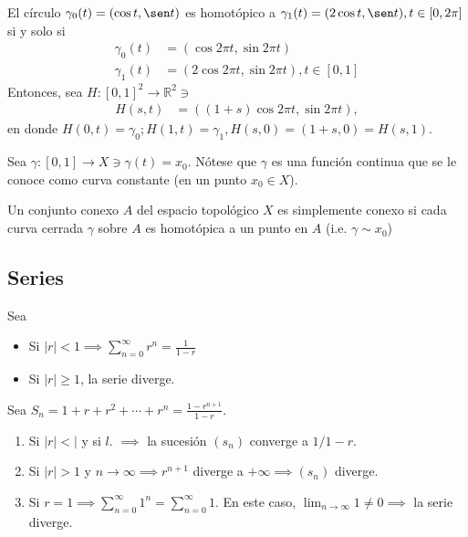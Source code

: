 \begin{ejemplo}
    El círculo $\gamma_0(t)=(\cos t,\sen t)$ es homotópico a $\gamma_1(t)=(2\cos t,\sen t),t\in [0,2\pi]$ si y solo si 
    \begin{align*}
        \gamma_0(t) &= (\cos 2\pi t,\sin 2\pi t)\\
        \gamma_1(t) &= (2\cos 2\pi t,\sin 2\pi t), t\in [0,1]
    \end{align*}
    Entonces, sea $H:[0,1]^2\to \mathbb{R}^2\ni$ 
    \begin{align*}
        H(s,t)&=\left((1+s)\cos2\pi t, \sin 2\pi t\right),
    \end{align*}
    en donde $H(0,t)=\gamma_0;H(1,t)=\gamma_1,H(s,0)=(1+s,0)=H(s,1)$.
\end{ejemplo}

\begin{nota}
    Sea $\gamma:[0,1]\to X\ni \gamma(t)=x_0$. Nótese que $\gamma$ es una función continua que se le conoce como curva constante (en un punto $x_0\in X$).
\end{nota}

\begin{definicion}
    Un conjunto conexo $A$ del espacio topológico $X$ es simplemente conexo si cada curva cerrada $\gamma$ sobre $A$ es homotópica a un punto en $A$ (i.e. $\gamma\sim x_0$)
\end{definicion}

\subsection{Series}

\begin{prop}
    Sea \begin{itemize}
        \item Si $|r|<1\implies \sum_{n=0}^{\infty}r^n =\frac{1}{1-r}$
        \item Si $|r|\geq 1$, la serie diverge. 
    \end{itemize}
    \begin{dem}
        Sea $S_n=1+r+r^2+\cdots+r^n=\frac{1-r^{n+1}}{1-r}$.
        \begin{enumerate}
            \item Si $|r|<|$ y si $l$. $\implies$ la sucesión $(s_n)$ converge a $1/1-r$. 
            \item Si $|r|>1$ y $n\to\infty\implies r^{n+1}$ diverge a $+\infty\implies (s_n)$ diverge.
            \item Si $r=1\implies \sum_{n=0}^{\infty}1^n =\sum_{n=0}^{\infty}1$. En este caso, $\lim_{n\to\infty}1\neq 0\implies$ la serie diverge. 
        \end{enumerate} 
        

    \end{dem}
    
\end{prop}